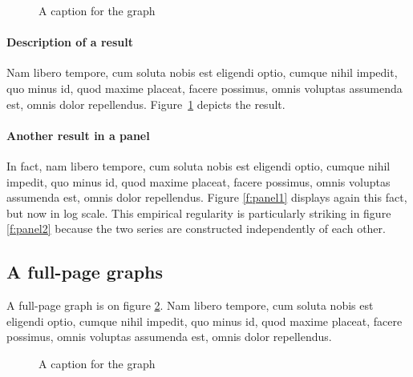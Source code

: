 \documentclass[letterpaper,12pt,leqno]{article}
\newcommand{\pdf}{figures.pdf}
\begin{document}
\begin{figure}[t]
\hfill
{}
\caption{A caption for the graph}
\label{f:graph1}\end{figure}

\paragraph{Description of a result} Nam libero tempore, cum soluta nobis est eligendi optio, cumque nihil impedit, quo minus id, quod maxime placeat, facere possimus, omnis voluptas assumenda est, omnis dolor repellendus. Figure~\ref{f:graph1} depicts the result.

\paragraph{Another result in a panel} In fact, nam libero tempore, cum soluta nobis est eligendi optio, cumque nihil impedit, quo minus id, quod maxime placeat, facere possimus, omnis voluptas assumenda est, omnis dolor repellendus. Figure \ref{f:panel1} displays again this fact, but now in log scale. This empirical regularity is particularly striking in figure \ref{f:panel2} because the two series are constructed independently of each other.

\subsection{A full-page graphs}

A full-page graph is on figure \ref{f:graph2}. Nam libero tempore, cum soluta nobis est eligendi optio, cumque nihil impedit, quo minus id, quod maxime placeat, facere possimus, omnis voluptas assumenda est, omnis dolor repellendus.

\begin{figure}[p]
\hfill
{}\vfig
{}\hfill
{}\vfig
{}\hfill
{}
\caption{A caption for the graph}
\label{f:graph2}\end{figure}
\end{document}
